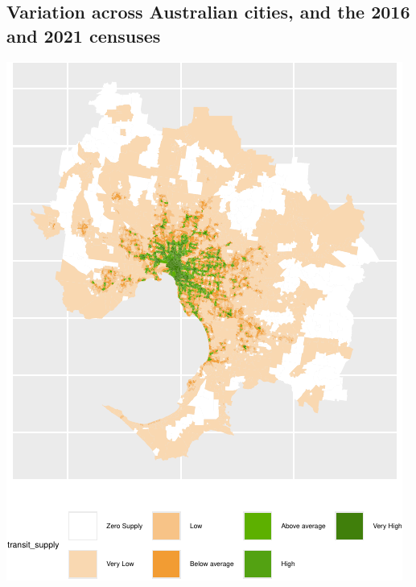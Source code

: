\documentclass[preprint, 3p,
authoryear]{elsarticle} %
\begin{document}
\hypertarget{variation-across-australian-cities-and-the-2016-and-2021-censuses}{%
\subsection{Variation across Australian cities, and the 2016 and 2021
censuses}\label{variation-across-australian-cities-and-the-2016-and-2021-censuses}}

\includegraphics{Leveraging_GTFS_to_assess_transit_supply_Transport_Geography_files/figure-latex/Australian_cities_2021-1.pdf}
\end{document}
